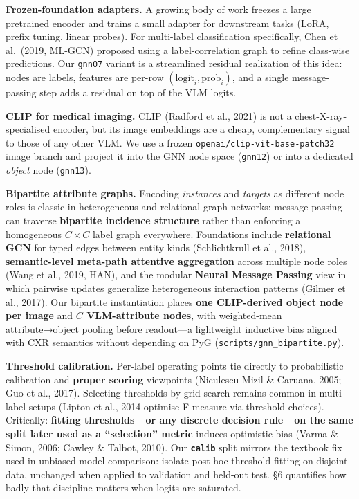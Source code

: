 \documentclass[
  11pt,
]{article}
\begin{document}
\textbf{Frozen-foundation adapters.} A growing body of work freezes a
large pretrained encoder and trains a small adapter for downstream tasks
(LoRA, prefix tuning, linear probes). For multi-label classification
specifically, Chen et al.~(2019, ML-GCN) proposed using a
label-correlation graph to refine class-wise predictions. Our
\texttt{gnn07} variant is a streamlined residual realization of this
idea: nodes are labels, features are per-row
\((\text{logit}_i, \text{prob}_i)\), and a single message-passing step
adds a residual on top of the VLM logits.

\textbf{CLIP for medical imaging.} CLIP (Radford et al., 2021) is not a
chest-X-ray-specialised encoder, but its image embeddings are a cheap,
complementary signal to those of any other VLM. We use a frozen
\texttt{openai/clip-vit-base-patch32} image branch and project it into
the GNN node space (\texttt{gnn12}) or into a dedicated \emph{object}
node (\texttt{gnn13}).

\textbf{Bipartite attribute graphs.} Encoding \emph{instances} and
\emph{targets} as different node roles is classic in heterogeneous and
relational graph networks: message passing can traverse
\textbf{bipartite incidence structure} rather than enforcing a
homogeneous \(C\!\times\!C\) label graph everywhere. Foundations include
\textbf{relational GCN} for typed edges between entity kinds
(Schlichtkrull et al., 2018), \textbf{semantic-level meta-path attentive
aggregation} across multiple node roles (Wang et al., 2019, HAN), and
the modular \textbf{Neural Message Passing} view in which pairwise
updates generalize heterogeneous interaction patterns (Gilmer et al.,
2017). Our bipartite instantiation places \textbf{one CLIP-derived
object node per image} and \textbf{\(C\) VLM-attribute nodes}, with
weighted-mean attribute→object pooling before readout---a lightweight
inductive bias aligned with CXR semantics without depending on PyG
(\texttt{scripts/gnn\_bipartite.py}).

\textbf{Threshold calibration.} Per-label operating points tie directly
to probabilistic calibration and \textbf{proper scoring} viewpoints
(Niculescu-Mizil \& Caruana, 2005; Guo et al., 2017). Selecting
thresholds by grid search remains common in multi-label setups (Lipton
et al., 2014 optimise F-measure via threshold choices). Critically:
\textbf{fitting thresholds---or any discrete decision rule---on the same
split later used as a ``selection'' metric} induces optimistic bias
(Varma \& Simon, 2006; Cawley \& Talbot, 2010). Our
\textbf{\texttt{calib}} split mirrors the textbook fix used in unbiased
model comparison: isolate post-hoc threshold fitting on disjoint data,
unchanged when applied to validation and held-out test. §6 quantifies
how badly that discipline matters when logits are saturated.
\end{document}
